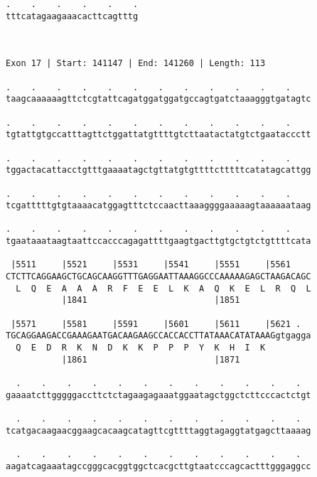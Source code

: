 \documentclass{article}
\begin{document}
\begin{Verbatim}
.    .    .    .    .    .
tttcatagaagaaacacttcagtttg
                          
                          
 
Exon 17 | Start: 141147 | End: 141260 | Length: 113
 
.    .    .    .    .    .    .    .    .    .    .    .    
taagcaaaaaagttctcgtattcagatggatggatgccagtgatctaaagggtgatagtc
                                                            
.    .    .    .    .    .    .    .    .    .    .    .    
tgtattgtgccatttagttctggattatgttttgtcttaatactatgtctgaataccctt
                                                            
.    .    .    .    .    .    .    .    .    .    .    .    
tggactacattacctgtttgaaaatagctgttatgtgttttctttttcatatagcattgg
                                                            
.    .    .    .    .    .    .    .    .    .    .    .    
tcgatttttgtgtaaaacatggagtttctccaacttaaaggggaaaaagtaaaaaataag
                                                            
.    .    .    .    .    .    .    .    .    .    .    .    
tgaataaataagtaattccacccagagattttgaagtgacttgtgctgtctgttttcata
                                                            
 |5511     |5521     |5531     |5541     |5551     |5561    
CTCTTCAGGAAGCTGCAGCAAGGTTTGAGGAATTAAAGGCCCAAAAAGAGCTAAGACAGC
  L  Q  E  A  A  A  R  F  E  E  L  K  A  Q  K  E  L  R  Q  L
           |1841                         |1851              
  
 |5571     |5581     |5591     |5601     |5611     |5621 .  
TGCAGGAAGACCGAAAGAATGACAAGAAGCCACCACCTTATAAACATATAAAGgtgagga
  Q  E  D  R  K  N  D  K  K  P  P  P  Y  K  H  I  K         
           |1861                         |1871              
  
  .    .    .    .    .    .    .    .    .    .    .    .  
gaaaatcttgggggaccttctctagaagagaaatggaatagctggctcttcccactctgt
                                                            
  .    .    .    .    .    .    .    .    .    .    .    .  
tcatgacaagaacggaagcacaagcatagttcgttttaggtagaggtatgagcttaaaag
                                                            
  .    .    .    .    .    .    .    .    .    .    .    .  
aagatcagaaatagccgggcacggtggctcacgcttgtaatcccagcactttgggaggcc
                                                            

\end{Verbatim}
\end{document}
